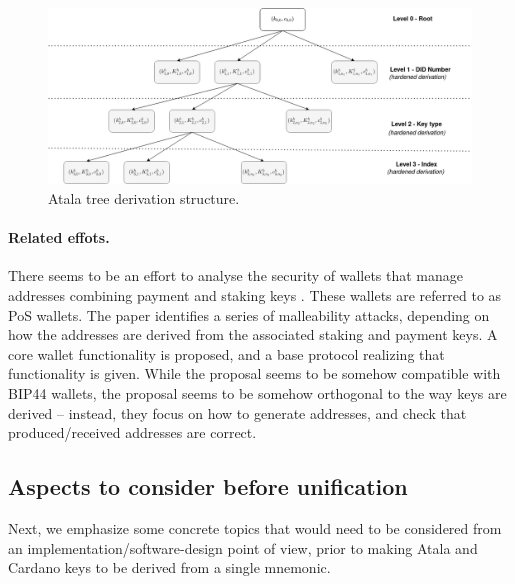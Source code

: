 \begin{figure}[ht]
  \includegraphics[width=\textwidth]{figures/atala_tree.png}
  \caption{Atala tree derivation structure.}
  \label{fig:atalatree}
\end{figure}

\paragraph{Related effots.} There seems to be an effort to analyse the security
of wallets that manage addresses combining payment and staking keys \cite{kkl20}.
These wallets are referred to as PoS wallets. The paper identifies a series of
malleability attacks, depending on how the addresses are derived from the
associated staking and payment keys. A core wallet functionality is proposed,
and a base protocol realizing that functionality is given. While the proposal
seems to be somehow compatible with BIP44 wallets, the proposal seems to be
somehow orthogonal to the way keys are derived -- instead, they focus on how
to generate addresses, and check that produced/received addresses are correct.

\subsection{Aspects to consider before unification}
\label{ssec:unification}

Next, we emphasize some concrete topics that would need to be considered
from an implementation/software-design point of view, prior to making
Atala and Cardano keys to be derived from a single mnemonic.

